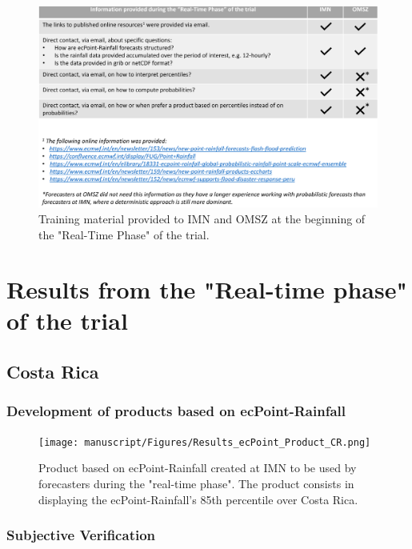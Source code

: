 \documentclass[twocol]{ametsocV5} %
\begin{document}
\begin{figure}
\centerline{\includegraphics[width=39pc]{manuscript/Figures/Methods_Remote_Training.png}}
\caption{Training material provided to IMN and OMSZ at the beginning of the "Real-Time Phase" of the trial.}
\label{Remote_Training}
\end{figure}
 

\section{Results from the "Real-time phase" of the trial}

\subsection{Costa Rica}

\subsubsection{Development of products based on ecPoint-Rainfall}

\begin{figure}
\centerline{\texttt{[image: manuscript/Figures/Results\_ecPoint\_Product\_CR.png]}}
\caption{Product based on ecPoint-Rainfall created at IMN to be used by forecasters during the "real-time phase". The product consists in displaying the ecPoint-Rainfall's 85th percentile over Costa Rica.}
\label{ecPoint_Product_CR}
\end{figure}

\subsubsection{Subjective Verification}
\end{document}
